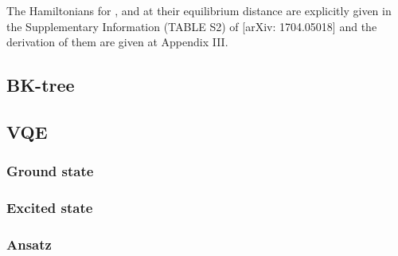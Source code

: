 \documentclass[11pt, oneside]{article}   	%
\begin{document}
The Hamiltonians for ,  and  at their equilibrium distance are explicitly given in the Supplementary Information (TABLE S2) of [arXiv: 1704.05018] and the derivation of them are given at Appendix III.



\subsection{BK-tree}

\subsection{VQE}
\subsubsection{Ground state}
\subsubsection{Excited state}
\subsubsection{Ansatz}
\end{document}
